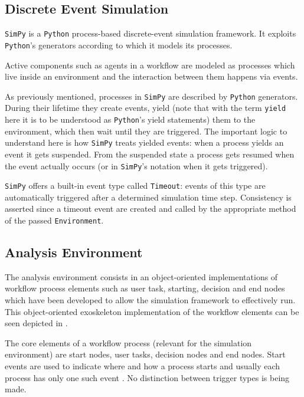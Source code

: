 \documentclass[draft=false]{seal_thesis}
\begin{document}
\subsection{Discrete Event Simulation}
\label{subsec:discrete_event_sim}

\texttt{SimPy} is a \texttt{Python} process-based discrete-event simulation framework. It exploits \texttt{Python}'s generators according to which it models its processes.

Active components such as agents in a workflow are modeled as processes which live inside an environment and the interaction between them happens via events.

As previously mentioned, processes in \texttt{SimPy} are described by \texttt{Python} generators. During their lifetime they create events, yield (note that with the term \texttt{yield} here it is to be understood as \texttt{Python}'s yield statements) them to the environment, which then wait until they are triggered. The important logic to understand here is how \texttt{SimPy} treats yielded events: when a process yields an event it gets suspended. From the suspended state a process gets resumed when the event actually occurs (or in \texttt{SimPy}'s notation when it gets triggered).

\texttt{SimPy} offers a built-in event type called \texttt{Timeout}: events of this type are automatically triggered after a determined simulation time step. Consistency is asserted since a timeout event are created and called by the appropriate method of the passed \texttt{Environment}.

\subsection{Analysis Environment}

The analysis environment consists in an object-oriented implementations of workflow process elements such as user task, starting, decision and end nodes which have been developed to allow the simulation framework to effectively run. This object-oriented exoskeleton implementation of the workflow elements can be seen depicted in .


The core elements of a workflow process (relevant for the simulation environment) are start nodes, user tasks, decision nodes and end nodes. Start events are used to indicate where and how a process starts and usually each process has only one such event \citep[p. 42]{Silver2011}. No distinction between trigger types is being made.
\end{document}
